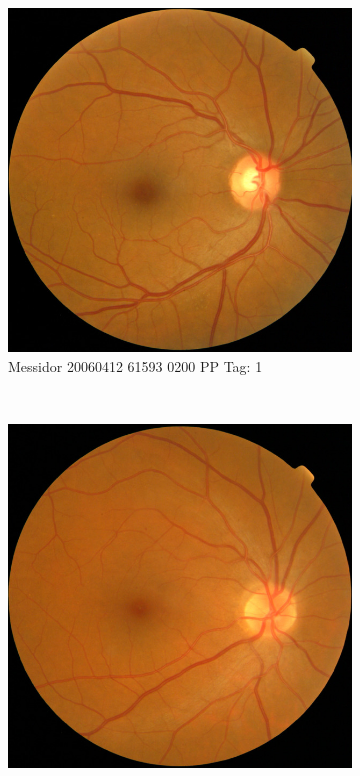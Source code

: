 \begin{figure}[ht!]
	\centering
	\begin{subfigure}[b]{0.4\textwidth}
		\centering
		\includegraphics[width=\textwidth]{Figures/chapter_stability/20060412_61593_0200_PP/20060412_61593_0200_PP.jpeg}
		\caption{Messidor 20060412 61593 0200 PP Tag: 1}
	\end{subfigure} ~
	\begin{subfigure}[b]{0.4\textwidth}
		\centering
		\includegraphics[width=\textwidth]{Figures/chapter_stability/20060411_62228_0200_PP/20060411_62228_0200_PP.jpeg}

\end{subfigure}
\end{figure}
